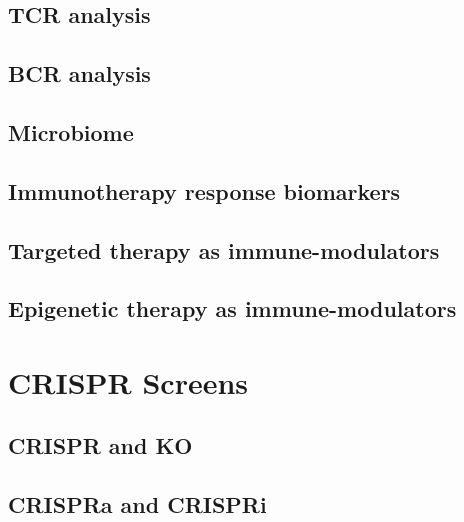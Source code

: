 \documentclass[
]{book}
\begin{document}
\hypertarget{tcr-analysis}{%
\section{TCR analysis}\label{tcr-analysis}}

\hypertarget{bcr-analysis}{%
\section{BCR analysis}\label{bcr-analysis}}

\hypertarget{microbiome}{%
\section{Microbiome}\label{microbiome}}

\hypertarget{immunotherapy-response-biomarkers}{%
\section{Immunotherapy response biomarkers}\label{immunotherapy-response-biomarkers}}

\hypertarget{targeted-therapy-as-immune-modulators}{%
\section{Targeted therapy as immune-modulators}\label{targeted-therapy-as-immune-modulators}}

\hypertarget{epigenetic-therapy-as-immune-modulators}{%
\section{Epigenetic therapy as immune-modulators}\label{epigenetic-therapy-as-immune-modulators}}

\hypertarget{crispr}{%
\chapter{CRISPR Screens}\label{crispr}}

\hypertarget{crispr-and-ko}{%
\section{CRISPR and KO}\label{crispr-and-ko}}

\hypertarget{crispra-and-crispri}{%
\section{CRISPRa and CRISPRi}\label{crispra-and-crispri}}
\end{document}

